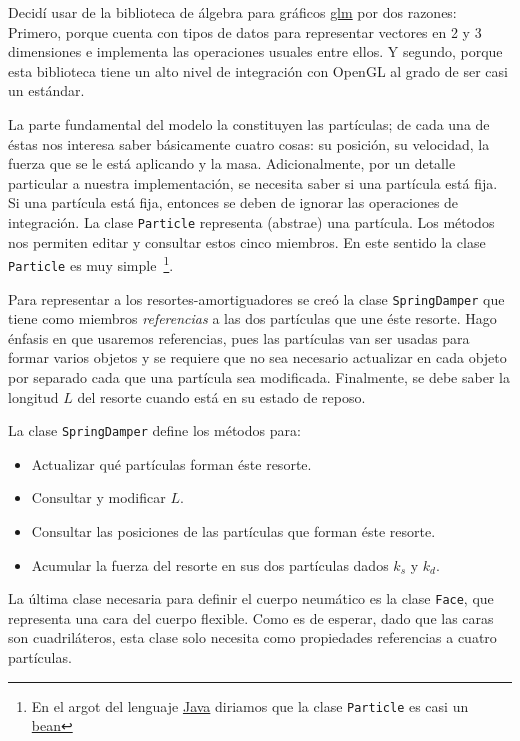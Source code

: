 Decidí usar de la biblioteca de álgebra para gráficos \href{http://github.com/g-truc/glm}{glm} por dos razones:
Primero, porque cuenta con tipos de datos para representar vectores en 2 y 3 dimensiones e implementa las operaciones usuales entre ellos.
Y segundo, porque esta biblioteca tiene un alto nivel de integración con OpenGL al grado de ser casi un estándar.

La parte fundamental del modelo la constituyen las partículas; de cada una de éstas nos interesa saber básicamente cuatro cosas: su posición, su velocidad, la fuerza que se le está aplicando y la masa.
Adicionalmente, por un detalle particular a nuestra implementación, se necesita saber si una partícula está fija.
Si una partícula está fija, entonces se deben de ignorar las operaciones de integración.
La clase \texttt{Particle} representa (abstrae) una partícula. Los métodos nos permiten editar y consultar estos cinco miembros.
En este sentido la clase \texttt{Particle} es muy simple~\footnote{En el argot del lenguaje \href{http://www.java.com/en/}{Java} diriamos que la clase \texttt{Particle} es casi un \href{http://en.wikipedia.org/wiki/JavaBeans}{bean}}.

Para representar a los resortes-amortiguadores se creó la clase \texttt{SpringDamper} que tiene como miembros \emph{referencias} a las dos partículas que une éste resorte.
Hago énfasis en que usaremos referencias, pues las partículas van ser usadas para formar varios objetos y se requiere que no sea necesario actualizar en cada objeto por separado cada que una partícula sea modificada. Finalmente, se debe saber la longitud $L$ del resorte cuando está en su estado de reposo.

La clase \texttt{SpringDamper} define los métodos para:
\begin{itemize}
 \item Actualizar qué partículas forman éste resorte.
 \item Consultar y modificar $L$.
 \item Consultar las posiciones de las partículas que forman éste resorte.
 \item Acumular la fuerza del resorte en sus dos partículas dados $k_s$ y $k_d$.
\end{itemize}

La última clase necesaria para definir el cuerpo neumático es la clase \texttt{Face}, que representa una cara del cuerpo flexible.
Como es de esperar, dado que las caras son cuadriláteros, esta clase solo necesita como propiedades referencias a cuatro partículas.

